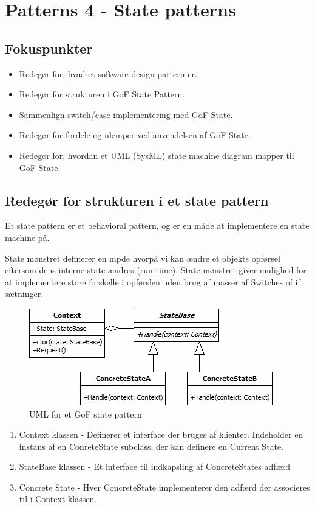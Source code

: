 \section{Patterns 4 - State patterns}

\subsection{Fokuspunkter}

\begin{itemize}
	\item Redegør for, hvad et software design pattern er.
	\item Redegør for strukturen i GoF State Pattern.
	\item Sammenlign  switch/case-implementering med GoF State.
	\item Redegør for fordele og ulemper ved anvendelsen af GoF State.
	\item Redegør for, hvordan et UML (SysML) state machine diagram mapper til GoF State.
\end{itemize}



\subsection{Redegør for strukturen i et state pattern}
Et state pattern er et behavioral pattern, og er en måde at implementere en state machine på.

State mønstret definerer en mpde hvorpå vi kan ændre et objekts opførsel eftersom dens interne state ændres (run-time).
State mønstret giver mulighed for at implementere store forskelle i opførslen uden brug af masser af Switches of if sætninger.

\begin{figure}[h]
\centering
\includegraphics[width=0.5\linewidth]{figs/state/gofState}
\caption{UML for et GoF state pattern}
\label{fig:gofState}
\end{figure}

\begin{enumerate}
	\item Context klassen - Definerer et interface der bruges af klienter. Indeholder en instans af en ConreteState subclass, der kan definere en Current State.
	\item StateBase klassen - Et interface til indkapsling af ConcreteStates adfærd
	\item Concrete State - Hver ConcreteState implementerer den adfærd der associeres til i Context klassen.
\end{enumerate}

